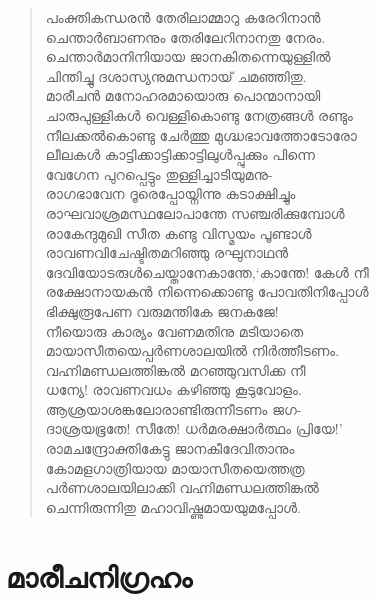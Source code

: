 \begin{verse}
പംക്തികന്ധരന്‍ തേരിലാമ്മാറു കരേറിനാന്‍\\
ചെന്താര്‍ബാണനും തേരിലേറിനാനതു നേരം.\\
ചെന്താര്‍മാനിനിയായ ജാനകിതന്നെയുള്ളില്‍\\
ചിന്തിച്ചു ദശാസ്യനുമന്ധനായ് ചമഞ്ഞിതു.\\
മാരീചന്‍ മനോഹരമായൊരു പൊന്മാനായി\\
ചാരുപുള്ളികള്‍ വെള്ളികൊണ്ടു നേത്രങ്ങള്‍ രണ്ടും\\
നീലക്കല്‍കൊണ്ടു ചേര്‍ത്തു മുഗ്ദ്ധഭാവത്തോടോരോ\\
ലീലകള്‍ കാട്ടിക്കാട്ടിക്കാട്ടിലുള്‍പ്പുക്കും പിന്നെ\\
വേഗേന പുറപ്പെട്ടും തുള്ളിച്ചാടിയുമനു-\\
രാഗഭാവേന ദൂരെപ്പോയ്നിന്നു കടാക്ഷിച്ചും\\
രാഘവാശ്രമസ്ഥലോപാന്തേ സഞ്ചരിക്കുമ്പോള്‍\\
രാകേന്ദുമുഖി സീത കണ്ടു വിസ്മയം പൂണ്ടാള്‍\\
രാവണവിചേഷ്ടിതമറിഞ്ഞു രഘുനാഥന്‍\\
ദേവിയോടരുള്‍ചെയ്താനേകാന്തേ,‘കാന്തേ! കേള്‍ നീ\\
രക്ഷോനായകന്‍ നിന്നെക്കൊണ്ടു \hbox{പോവതിനിപ്പോള്‍}\\
ഭിക്ഷുരൂപേണ വരുമന്തികേ ജനകജേ!\\
നീയൊരു കാര്യം വേണമതിനു മടിയാതെ\\
മായാസീതയെപ്പര്‍ണശാലയില്‍ നിര്‍ത്തീടണം.\\
വഹ്നിമണ്ഡലത്തിങ്കല്‍ മറഞ്ഞുവസിക്ക നീ\\
ധന്യേ! രാവണവധം കഴിഞ്ഞു കൂടുവോളം.\\
ആശ്രയാശങ്കലോരാണ്ടിരുന്നീടണം ജഗ-\\
ദാശ്രയഭൂതേ! സീതേ! ധര്‍മരക്ഷാര്‍ത്ഥം പ്രിയേ!’\\
രാമചന്ദ്രോക്തികേട്ടു ജാനകീദേവിതാനും\\
കോമളഗാത്രിയായ മായാസീതയെത്തത്ര\\
പര്‍ണശാലയിലാക്കി വഹ്നിമണ്ഡലത്തിങ്കല്‍\\
ചെന്നിരുന്നിതു മഹാവിഷ്ണുമായയുമപ്പോള്‍.
\end{verse}

\section{മാരീചനിഗ്രഹം}

